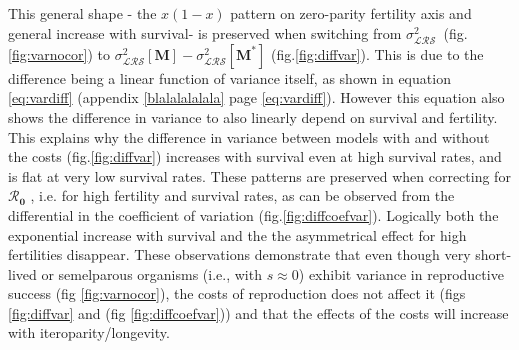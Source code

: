 \documentclass[10pt,a4paper]{article}
\newcommand{\Rzero}{$\boldsymbol{\mathcal{R}_{0}}$  }
\newcommand{\vLRO}{$\sigma_{\mathrm{\mathcal{LRS}}}^2$}
\begin{document}
This general shape - the $x(1-x)$ pattern on zero-parity fertility axis and general increase with survival- is preserved when switching from \vLRO\ (fig.\ref{fig:varnocor}) to  $\sigma^{2}_{\mathcal{LRS}}\left[ \mathbf{M}\right] -\sigma^{2}_{\mathcal{LRS}}\left[ \mathbf{M^{*}}\right]$ (fig.\ref{fig:diffvar}). This is due to the difference being a linear function of variance itself, as shown in equation \ref{eq:vardiff} (appendix \ref{blalalalalala} page \ref{eq:vardiff}). However this equation also shows the difference in variance to also linearly depend on survival and fertility. This explains why the difference in variance between models with and without the costs (fig.\ref{fig:diffvar}) increases with survival even at high survival rates, and is flat at very low survival rates. These patterns are preserved when correcting for \Rzero, i.e. for high fertility and survival rates, as can be observed from the differential in the coefficient of variation (fig.\ref{fig:diffcoefvar}). Logically both the exponential increase with survival and the the asymmetrical effect for high fertilities disappear. These observations demonstrate that even though very short-lived or semelparous organisms (i.e., with $s \approx 0$) exhibit variance in reproductive success (fig \ref{fig:varnocor}), the costs of reproduction does not affect it (figs \ref{fig:diffvar} and (fig \ref{fig:diffcoefvar})) and that the effects of the costs will increase with iteroparity/longevity.\\



\end{document}
